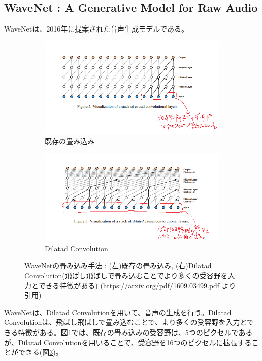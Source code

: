 \documentclass{ltjsarticle}
\begin{document}
\subsection{WaveNet : A Generative Model for Raw Audio}
WaveNetは、2016年に提案された音声生成モデルである。
\begin{figure}[htbp]
  \centering
  \begin{subfigure}[b]{0.45\textwidth}
    \centering
    \includegraphics[width=\textwidth]{./capture/WaveNet_1.png}
    \caption{既存の畳み込み}
    \label{fig:WaveNet_1}
  \end{subfigure}
  \hfill
  \begin{subfigure}[b]{0.45\textwidth}
    \centering
    \includegraphics[width=\textwidth]{./capture/WaveNet_2.png}
    \caption{Dilatad Convolution}
    \label{fig:WaveNet_2}
  \end{subfigure}
  \caption{WaveNetの畳み込み手法 : (左)既存の畳み込み, (右)Dilatad Convolution(飛ばし飛ばしで畳み込むことでより多くの受容野を入力とできる特徴がある) (https://arxiv.org/pdf/1609.03499.pdf より引用)}
\end{figure}
WaveNetは、Dilatad Convolutionを用いて、音声の生成を行う。Dilatad Convolutionは、飛ばし飛ばしで畳み込むことで、より多くの受容野を入力とできる特徴がある。図\ref{fig:WaveNet_1}では、既存の畳み込みの受容野は、5つのピクセルであるが、Dilatad Convolutionを用いることで、受容野を16つのピクセルに拡張することができる(図\ref{fig:WaveNet_2})。
\end{document}
